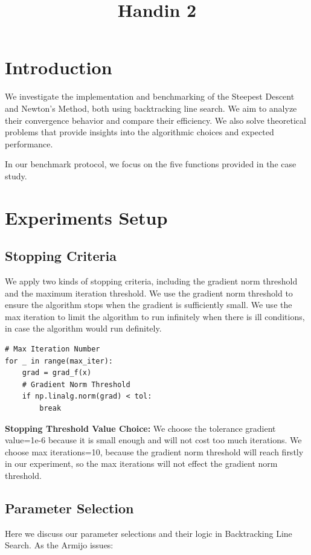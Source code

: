 \documentclass[12pt]{article}
\title{Handin 2}
\begin{document}
\maketitle

\section{Introduction}

We investigate the implementation and benchmarking of the Steepest Descent and Newton's Method, both using backtracking line search. We aim to analyze their convergence behavior and compare their efficiency.  We also solve theoretical problems that provide insights into the algorithmic choices and expected performance. 

In our benchmark protocol, we focus on the five functions provided in the case study. 

\section{Experiments Setup}

\subsection{Stopping Criteria}
We apply two kinds of stopping criteria, including the gradient norm threshold and the maximum iteration threshold. We use the gradient norm threshold to ensure the algorithm stops when the gradient is sufficiently small. We use the max iteration to limit the algorithm to run infinitely when there is ill conditions, in case the algorithm would run definitely.

\begin{lstlisting}
# Max Iteration Number
for _ in range(max_iter): 
    grad = grad_f(x)
    # Gradient Norm Threshold 
    if np.linalg.norm(grad) < tol:
        break
\end{lstlisting}

\textbf{Stopping Threshold Value Choice: }We choose the tolerance gradient value=1e-6 because it is small enough and will not cost too much iterations. We choose max iterations=10, because the gradient norm threshold will reach firstly in our experiment, so the max iterations will not effect the gradient norm threshold. 

\subsection{Parameter Selection }
Here we discuss our parameter selections and their logic in Backtracking Line Search. As the Armijo issues:
\end{document}
